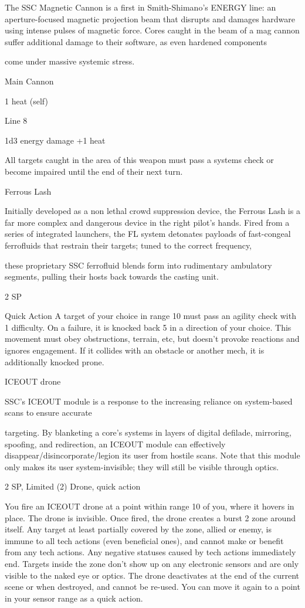The SSC Magnetic Cannon is a first in Smith-Shimano’s ENERGY line: an aperture-focused magnetic
projection beam that disrupts and damages hardware using intense pulses of magnetic force. Cores caught
in the beam of a mag cannon suffer additional damage to their software, as even hardened components

come under massive systemic stress.

Main Cannon

1 heat (self)

Line 8

1d3 energy damage +1 heat

All targets caught in the area of this weapon must pass a systems check or become impaired
until the end of their next turn.


Ferrous Lash

Initially developed as a non lethal crowd suppression device, the Ferrous Lash is a far more complex and
dangerous device in the right pilot’s hands. Fired from a series of integrated launchers, the FL system
detonates payloads of fast-congeal ferrofluids that restrain their targets; tuned to the correct frequency,

these proprietary SSC ferrofluid blends form into rudimentary ambulatory segments, pulling their hosts
back towards the casting unit.

2 SP




Quick Action
A target of your choice in range 10 must pass an agility check with 1 difficulty. On a failure, it is
knocked back 5 in a direction of your choice. This movement must obey obstructions, terrain,
etc, but doesn't provoke reactions and ignores engagement. If it collides with an obstacle or
another mech, it is additionally knocked prone.


ICEOUT drone

SSC’s ICEOUT module is a response to the increasing reliance on system-based scans to ensure accurate

targeting. By blanketing a core’s systems in layers of digital defilade, mirroring, spoofing, and redirection,
an ICEOUT module can effectively disappear/disincorporate/legion its user from hostile scans. Note that
this module only makes its user system-invisible; they will still be visible through optics.

2 SP, Limited (2)
Drone, quick action

You fire an ICEOUT drone at a point within range 10 of you, where it hovers in place. The drone is
invisible. Once fired, the drone creates a burst 2 zone around itself. Any target at least partially
covered by the zone, allied or enemy, is immune to all tech actions (even beneficial ones), and
cannot make or benefit from any tech actions. Any negative statuses caused by tech actions
immediately end. Targets inside the zone don’t show up on any electronic sensors and are only
visible to the naked eye or optics. The drone deactivates at the end of the current scene or when
destroyed, and cannot be re-used. You can move it again to a point in your sensor range as a
quick action.



